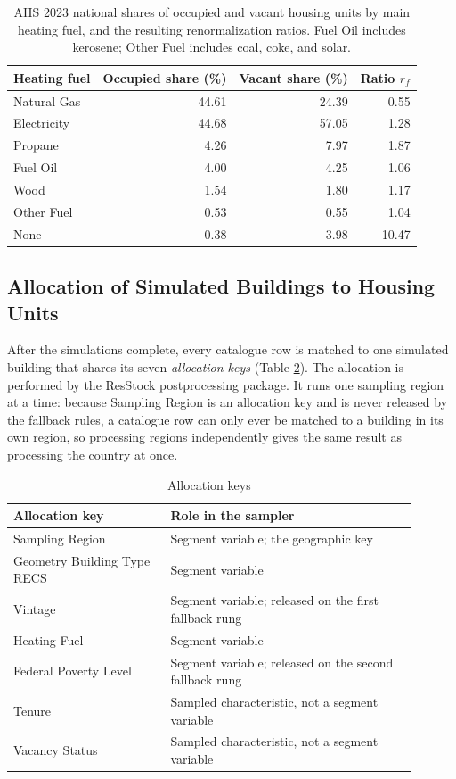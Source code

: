 \begin{table}
    \centering
    \begin{tabular}{lrrr}
    \hline
    Heating fuel & Occupied share (\%) & Vacant share (\%) & Ratio $r_f$ \\
    \hline
    Natural Gas & 44.61 & 24.39 & 0.55 \\
    Electricity & 44.68 & 57.05 & 1.28 \\
    Propane & 4.26 & 7.97 & 1.87 \\
    Fuel Oil & 4.00 & 4.25 & 1.06 \\
    Wood & 1.54 & 1.80 & 1.17 \\
    Other Fuel & 0.53 & 0.55 & 1.04 \\
    None & 0.38 & 3.98 & 10.47 \\
    \hline
    \end{tabular}
    \caption{AHS 2023 national shares of occupied and vacant housing units by main heating fuel, and the resulting renormalization ratios. Fuel Oil includes kerosene; Other Fuel includes coal, coke, and solar.}
    \label{tab:ahs_vacancy_tilt}
\end{table}

\subsection{Allocation of Simulated Buildings to Housing Units}\label{sec:allocation}
After the simulations complete, every catalogue row is matched to one simulated building that shares its seven \textit{allocation keys} (Table \ref{tab:allocation_keys}). The allocation is performed by the ResStock postprocessing package. It runs one sampling region at a time: because Sampling Region is an allocation key and is never released by the fallback rules, a catalogue row can only ever be matched to a building in its own region, so processing regions independently gives the same result as processing the country at once.

\begin{table}
    \centering
    \begin{tabular}{p{0.35\linewidth}p{0.55\linewidth}}
    \hline
    Allocation key & Role in the sampler \\
    \hline
    Sampling Region & Segment variable; the geographic key \\
    Geometry Building Type RECS & Segment variable \\
    Vintage & Segment variable; released on the first fallback rung \\
    Heating Fuel & Segment variable \\
    Federal Poverty Level & Segment variable; released on the second fallback rung \\
    Tenure & Sampled characteristic, not a segment variable \\
    Vacancy Status & Sampled characteristic, not a segment variable \\
    \hline
    \end{tabular}
    \caption{Allocation keys}
    \label{tab:allocation_keys}
\end{table}

